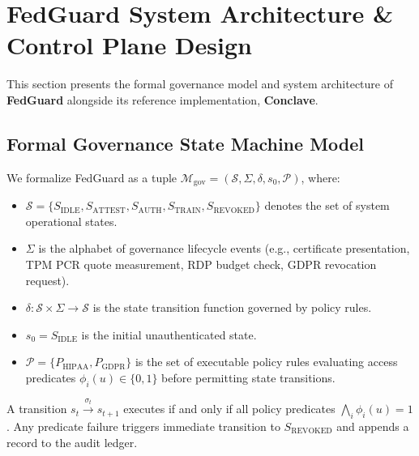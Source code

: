 \section{FedGuard System Architecture \& Control Plane Design}
\label{sec:architecture}

This section presents the formal governance model and system architecture of \textbf{FedGuard} alongside its reference implementation, \textbf{Conclave}.

\subsection{Formal Governance State Machine Model}

We formalize FedGuard as a tuple $\mathcal{M}_{\text{gov}} = (\mathcal{S}, \Sigma, \delta, s_0, \mathcal{P})$, where:
\begin{itemize}
    \item $\mathcal{S} = \{S_{\text{IDLE}}, S_{\text{ATTEST}}, S_{\text{AUTH}}, S_{\text{TRAIN}}, S_{\text{REVOKED}}\}$ denotes the set of system operational states.
    \item $\Sigma$ is the alphabet of governance lifecycle events (e.g., certificate presentation, TPM PCR quote measurement, RDP budget check, GDPR revocation request).
    \item $\delta: \mathcal{S} \times \Sigma \to \mathcal{S}$ is the state transition function governed by policy rules.
    \item $s_0 = S_{\text{IDLE}}$ is the initial unauthenticated state.
    \item $\mathcal{P} = \{P_{\text{HIPAA}}, P_{\text{GDPR}}\}$ is the set of executable policy rules evaluating access predicates $\phi_i(u) \in \{0, 1\}$ before permitting state transitions.
\end{itemize}

A transition $s_t \xrightarrow{\sigma_t} s_{t+1}$ executes if and only if all policy predicates $\bigwedge_{i} \phi_i(u) = 1$. Any predicate failure triggers immediate transition to $S_{\text{REVOKED}}$ and appends a record to the audit ledger.

